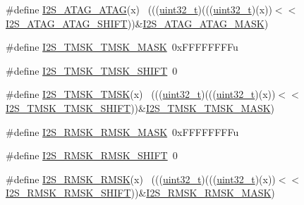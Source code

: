 \begin{DoxyCompactItemize}
\item 
\#define \hyperlink{group___i2_s___register___masks_gad0941c50a40ceb27cb7cfec4ba5b02ef}{I2\+S\+\_\+\+A\+T\+A\+G\+\_\+\+A\+T\+AG}(x)                                              ~(((\hyperlink{_p_e___types_8h_a33594304e786b158f3fb30289278f5af}{uint32\+\_\+t})(((\hyperlink{_p_e___types_8h_a33594304e786b158f3fb30289278f5af}{uint32\+\_\+t})(x))$<$$<$\hyperlink{group___i2_s___register___masks_gaad3cfb945e986391638fe140cc5912c2}{I2\+S\+\_\+\+A\+T\+A\+G\+\_\+\+A\+T\+A\+G\+\_\+\+S\+H\+I\+FT}))\&\hyperlink{group___i2_s___register___masks_gaef4fbbc71e936b494f848778db00974f}{I2\+S\+\_\+\+A\+T\+A\+G\+\_\+\+A\+T\+A\+G\+\_\+\+M\+A\+SK})
\item 
\#define \hyperlink{group___i2_s___register___masks_ga1d918fdc6a9ac2600cba87835fed4c8c}{I2\+S\+\_\+\+T\+M\+S\+K\+\_\+\+T\+M\+S\+K\+\_\+\+M\+A\+SK}~0x\+F\+F\+F\+F\+F\+F\+F\+Fu
\item 
\#define \hyperlink{group___i2_s___register___masks_gab9c86bbc23ff6147857b8e34eaf5ba10}{I2\+S\+\_\+\+T\+M\+S\+K\+\_\+\+T\+M\+S\+K\+\_\+\+S\+H\+I\+FT}~0
\item 
\#define \hyperlink{group___i2_s___register___masks_gafe5e00eb1a3f8f31b3de497e7bedc453}{I2\+S\+\_\+\+T\+M\+S\+K\+\_\+\+T\+M\+SK}(x)                                              ~(((\hyperlink{_p_e___types_8h_a33594304e786b158f3fb30289278f5af}{uint32\+\_\+t})(((\hyperlink{_p_e___types_8h_a33594304e786b158f3fb30289278f5af}{uint32\+\_\+t})(x))$<$$<$\hyperlink{group___i2_s___register___masks_gab9c86bbc23ff6147857b8e34eaf5ba10}{I2\+S\+\_\+\+T\+M\+S\+K\+\_\+\+T\+M\+S\+K\+\_\+\+S\+H\+I\+FT}))\&\hyperlink{group___i2_s___register___masks_ga1d918fdc6a9ac2600cba87835fed4c8c}{I2\+S\+\_\+\+T\+M\+S\+K\+\_\+\+T\+M\+S\+K\+\_\+\+M\+A\+SK})
\item 
\#define \hyperlink{group___i2_s___register___masks_ga45e2bc17b0f5e6f14de39469b3a7fc1a}{I2\+S\+\_\+\+R\+M\+S\+K\+\_\+\+R\+M\+S\+K\+\_\+\+M\+A\+SK}~0x\+F\+F\+F\+F\+F\+F\+F\+Fu
\item 
\#define \hyperlink{group___i2_s___register___masks_gabe0f87493c2ec37e3f743400a9876914}{I2\+S\+\_\+\+R\+M\+S\+K\+\_\+\+R\+M\+S\+K\+\_\+\+S\+H\+I\+FT}~0
\item 
\#define \hyperlink{group___i2_s___register___masks_ga672c503f9442707c30ab341915272b89}{I2\+S\+\_\+\+R\+M\+S\+K\+\_\+\+R\+M\+SK}(x)                                              ~(((\hyperlink{_p_e___types_8h_a33594304e786b158f3fb30289278f5af}{uint32\+\_\+t})(((\hyperlink{_p_e___types_8h_a33594304e786b158f3fb30289278f5af}{uint32\+\_\+t})(x))$<$$<$\hyperlink{group___i2_s___register___masks_gabe0f87493c2ec37e3f743400a9876914}{I2\+S\+\_\+\+R\+M\+S\+K\+\_\+\+R\+M\+S\+K\+\_\+\+S\+H\+I\+FT}))\&\hyperlink{group___i2_s___register___masks_ga45e2bc17b0f5e6f14de39469b3a7fc1a}{I2\+S\+\_\+\+R\+M\+S\+K\+\_\+\+R\+M\+S\+K\+\_\+\+M\+A\+SK})
$$
\end{DoxyCompactItemize}
